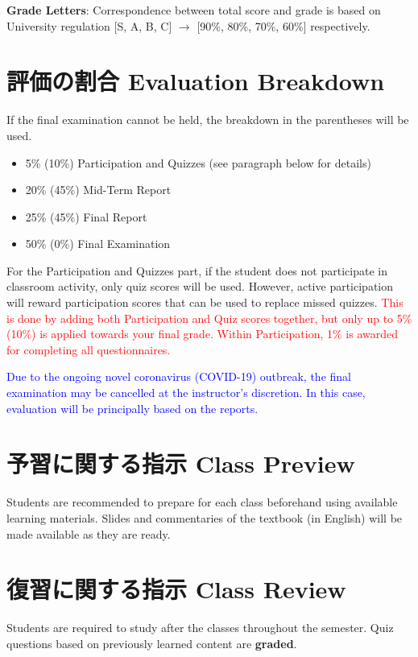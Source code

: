 \documentclass[a4paper]{article}
\begin{document}
\smallskip\noindent
\textbf{Grade Letters}: Correspondence between total score and grade is based on University regulation [S, A, B, C] $\rightarrow$ [90\%, 80\%, 70\%, 60\%] respectively.

\section{評価の割合 Evaluation Breakdown}
If the final examination cannot be held, the breakdown in the parentheses will be used.

\begin{itemize}
    \item 5\% (10\%) Participation and Quizzes (see paragraph below for details)
    \item 20\% (45\%) Mid-Term Report
    \item 25\% (45\%) Final Report
    \item 50\% (0\%) Final Examination
\end{itemize}

For the Participation and Quizzes part, if the student does not participate in classroom activity, only quiz scores will be used. However, active participation will reward participation scores that can be used to replace missed quizzes. \textcolor{red}{This is done by adding both Participation and Quiz scores together, but only up to 5\% (10\%) is applied towards your final grade. Within Participation, 1\% is awarded for completing all questionnaires.}

\textcolor{blue}{Due to the ongoing novel coronavirus (COVID-19) outbreak, the final examination may be cancelled at the instructor's discretion. In this case, evaluation will be principally based on the reports.}

\section{予習に関する指示 Class Preview}
Students are recommended to prepare for each class beforehand using available learning materials. Slides and commentaries of the textbook (in English) will be made available as they are ready.

\section{復習に関する指示 Class Review}
Students are required to study after the classes throughout the semester. Quiz questions based on previously learned content are \textbf{graded}.
\end{document}
